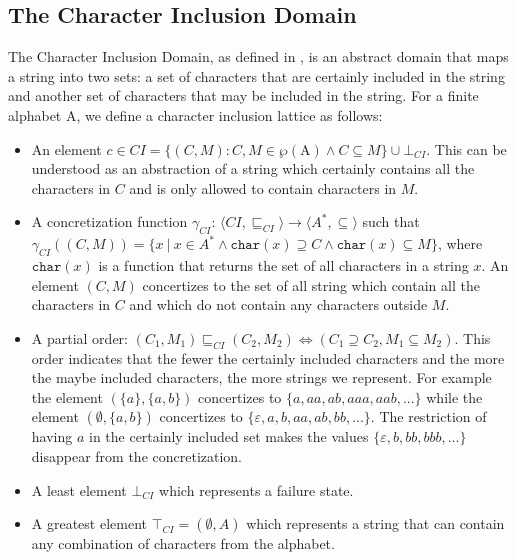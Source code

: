 \documentclass[10pt]{report}
\begin{document}
\subsection{The Character Inclusion Domain} \label{character}
The Character Inclusion Domain, as defined in \cite{character}, is an abstract domain that maps a string into two sets: a set of characters that are certainly included in the string and another set of characters that may be included in the string. 
For a finite alphabet $\mathrm{A}$, we define a character inclusion lattice as follows: 
\begin{itemize}
	\item An element $c \in CI = \lbrace(C, M): C, M \in \wp (\mathrm{A}) \land C \subseteq M \rbrace \cup \bot_{CI}$. This can be understood as an abstraction of a string which certainly contains all the characters in $C$ and is only allowed to contain characters in $ M $.
	
	\item A concretization function $\gamma_{CI}$: $\langle CI, \sqsubseteq_{CI}\rangle  \longrightarrow \langle A^{*}, \subseteq\rangle$ such that \\ $ \gamma_{CI}((C, M)) = \lbrace x\ \vert\ x \in A^{*} \wedge \mathtt{char}(x) \supseteq C \wedge \mathtt{char}(x) \subseteq M \rbrace $, where $ \mathtt{char}(x) $ is a function that returns the set of all characters in a string  $ x $.  An element $ (C, M) $ concertizes to the set of all string which contain all the characters in $ C $ and which do not contain any characters outside $ M $. 
	
	\item A partial order: $(C_{1}, M_{1}) \sqsubseteq_{CI} (C_{2}, M_{2}) \iff (C_{1} \supseteq C_{2}, M_{1} \subseteq M_{2})$. This order indicates that the fewer the certainly included characters and the more the maybe included characters, the more strings we represent. For example the element $(\lbrace a \rbrace , \lbrace a,b \rbrace)$ concertizes to $\lbrace a, aa, ab, aaa, aab,... \rbrace$ while the element $(\emptyset, \lbrace a, b \rbrace)$ concertizes to $\lbrace\varepsilon, a, b, aa, ab, bb,...\rbrace$. The restriction of having $a$ in the certainly included set makes the values $\lbrace \varepsilon, b, bb, bbb,...\rbrace $ disappear from the concretization. 
	
	\item A least element $\bot_{CI}$ which represents a failure state. 
	\item A greatest element $\top_{CI} = (\emptyset, A) $ which represents a string that can contain any combination of characters from the alphabet. 
	

\end{itemize}
\end{document}
